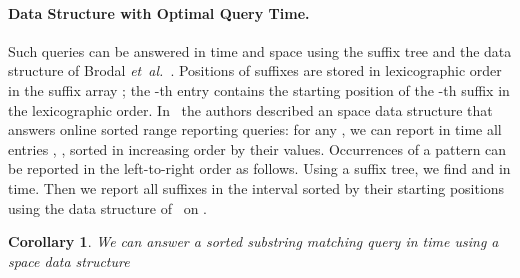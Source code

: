 \documentclass[11pt]{article}
\def\etal{\emph{et~al.}}
\newtheorem{corollary}{Corollary}
\begin{document}
\paragraph{Data Structure with Optimal Query Time.}
Such queries can be answered in 
 time and  space using the suffix tree and the data structure  of Brodal \etal~\cite{BrodalFGL09}. 
Positions of suffixes are stored in lexicographic order in the suffix array ;
the -th entry  contains the starting position of the -th suffix in 
the lexicographic order.  In~\cite{BrodalFGL09} the authors described an  space data structure that answers online sorted range reporting queries: 
for any , we can report in  time 
all entries , , sorted in increasing order by their 
values. Occurrences of a pattern  can be reported in the left-to-right order as follows.  Using a suffix tree, we find  and  in  time. Then we report all suffixes in the interval 
 sorted by their starting positions 
using the data structure of~\cite{BrodalFGL09} on . 
\begin{corollary}\label{cor:sortlin}
We can answer a sorted  substring matching query in  time using a  space data structure
\end{corollary}
\end{document}
